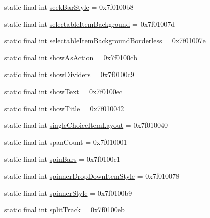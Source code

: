 \begin{CompactItemize}
\item 
static final int \hyperlink{classandroid_1_1support_1_1graphics_1_1drawable_1_1_r_1_1attr_6ff64e4c9e17a5c22388ab8e6218ff73}{seekBarStyle} = 0x7f0100b8
\item 
static final int \hyperlink{classandroid_1_1support_1_1graphics_1_1drawable_1_1_r_1_1attr_c220798e3d2dc8bf3cdb7b0a0adb411a}{selectableItemBackground} = 0x7f01007d
\item 
static final int \hyperlink{classandroid_1_1support_1_1graphics_1_1drawable_1_1_r_1_1attr_7ed6d26366c620cdb135267f6837382a}{selectableItemBackgroundBorderless} = 0x7f01007e
\item 
static final int \hyperlink{classandroid_1_1support_1_1graphics_1_1drawable_1_1_r_1_1attr_21e8ccf03882a6252b96501e274fcb31}{showAsAction} = 0x7f0100cb
\item 
static final int \hyperlink{classandroid_1_1support_1_1graphics_1_1drawable_1_1_r_1_1attr_840adc911fc47e8b8b9495e73c767110}{showDividers} = 0x7f0100c9
\item 
static final int \hyperlink{classandroid_1_1support_1_1graphics_1_1drawable_1_1_r_1_1attr_f00774529f1446f4c95e6a2e354a1176}{showText} = 0x7f0100ec
\item 
static final int \hyperlink{classandroid_1_1support_1_1graphics_1_1drawable_1_1_r_1_1attr_7c02fb72f0ed75ac455f72b415c65a72}{showTitle} = 0x7f010042
\item 
static final int \hyperlink{classandroid_1_1support_1_1graphics_1_1drawable_1_1_r_1_1attr_52dcac8ed15c57595cf656c16bdcaecd}{singleChoiceItemLayout} = 0x7f010040
\item 
static final int \hyperlink{classandroid_1_1support_1_1graphics_1_1drawable_1_1_r_1_1attr_eabf3465dd3f604a81035b961dd5f9ad}{spanCount} = 0x7f010001
\item 
static final int \hyperlink{classandroid_1_1support_1_1graphics_1_1drawable_1_1_r_1_1attr_1ea4154167f0239cb7ca6e7f27612827}{spinBars} = 0x7f0100c1
\item 
static final int \hyperlink{classandroid_1_1support_1_1graphics_1_1drawable_1_1_r_1_1attr_22f36d555e77115c843d98a3f3f3bd5b}{spinnerDropDownItemStyle} = 0x7f010078
\item 
static final int \hyperlink{classandroid_1_1support_1_1graphics_1_1drawable_1_1_r_1_1attr_fb9cf0ad45aec7e5c8044d19af4856db}{spinnerStyle} = 0x7f0100b9
\item 
static final int \hyperlink{classandroid_1_1support_1_1graphics_1_1drawable_1_1_r_1_1attr_b7c451456ce8886338304e55d42a58a8}{splitTrack} = 0x7f0100eb

\end{CompactItemize}
